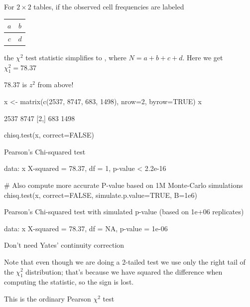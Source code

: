 \item For $2 \times 2$ tables, if the observed cell frequencies are labeled
\begin{tabular}{|c|c|} \hline
$a$ & $b$ \\ \hline
$c$ & $d$ \\ \hline
\end{tabular}
the $\chi^{2}$ test statistic simplifies to
\beq
{},
\eeq
where $N=a+b+c+d$.  Here we get $\chi^{2}_{1} = 78.37$
\item 78.37 is $z^2$ from above!
\begin{Schunk}
\begin{Sinput}
x <- matrix(c(2537, 8747, 683, 1498), nrow=2, byrow=TRUE)
x
\end{Sinput}
\begin{Soutput}
     [,1] [,2]
[1,] 2537 8747
[2,]  683 1498
\end{Soutput}
\begin{Sinput}
chisq.test(x, correct=FALSE)
\end{Sinput}
\begin{Soutput}

	Pearson's Chi-squared test

data:  x
X-squared = 78.37, df = 1, p-value < 2.2e-16
\end{Soutput}
\begin{Sinput}
# Also compute more accurate P-value based on 1M Monte-Carlo simulations
chisq.test(x, correct=FALSE, simulate.p.value=TRUE, B=1e6)
\end{Sinput}
\begin{Soutput}

	Pearson's Chi-squared test with simulated p-value (based on 1e+06
	replicates)

data:  x
X-squared = 78.37, df = NA, p-value = 1e-06
\end{Soutput}
\end{Schunk}
\item Don't need Yates' continuity correction
\item Note that even though we are doing a 2-tailed
test we use only the right tail of the $\chi^{2}_{1}$ distribution;
that's because we have squared the difference when computing the
statistic, so the sign is lost.
\item This is the ordinary Pearson $\chi^2$ test
\ei

